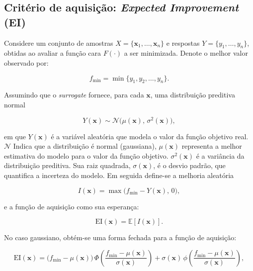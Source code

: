 \subsection{Critério de aquisição: \textit{Expected Improvement} (EI)}

Considere um conjunto de amostras $X=\{\mathbf{x}_1,\ldots,\mathbf{x}_n\}$ e respostas $Y=\{y_1,\ldots,y_n\}$, obtidas ao avaliar a função cara $F(\cdot)$ a ser minimizada. Denote o melhor valor observado por:

\begin{equation}
f_{\min}=\min\{y_1,y_2,\ldots,y_n\}.
\end{equation}

Assumindo que o \textit{surrogate} fornece, para cada $\mathbf{x}$, uma distribuição preditiva normal

\begin{equation}
Y(\mathbf{x}) \sim \mathcal{N}\big(\mu(\mathbf{x}),\,\sigma^2(\mathbf{x})\big),
\end{equation}

em que $Y(\mathbf{x})$ é a variável aleatória que modela o valor da função objetivo real. $\mathcal{N}$ Indica que a distribuição é normal (gaussiana), $\mu(\mathbf{x})$ representa a melhor estimativa do modelo para o valor da função objetivo. $\sigma^2(\mathbf{x})$ é a variância da distribuição preditiva. Sua raiz quadrada, 
$\sigma(\mathbf{x})$, é o desvio padrão, que quantifica a incerteza do modelo. Em seguida define-se a melhoria aleatória

\begin{equation}
I(\mathbf{x})=\max\big(f_{\min}-Y(\mathbf{x}),\,0\big),
\end{equation}

e a função de aquisição como sua esperança:

\begin{equation}
\mathrm{EI}(\mathbf{x})=\mathbb{E}[I(\mathbf{x})].
\end{equation}

No caso gaussiano, obtém-se uma forma fechada \cite{Jones1998} para a função de aquisição:

\begin{equation}
\mathrm{EI}(\mathbf{x})=
\big(f_{\min}-\mu(\mathbf{x})\big)\,
\Phi\!\left(\frac{f_{\min}-\mu(\mathbf{x})}{\sigma(\mathbf{x})}\right)
+\sigma(\mathbf{x})\,
\phi\!\left(\frac{f_{\min}-\mu(\mathbf{x})}{\sigma(\mathbf{x})}\right),
\label{eq:ei_closed_form}
\end{equation}

